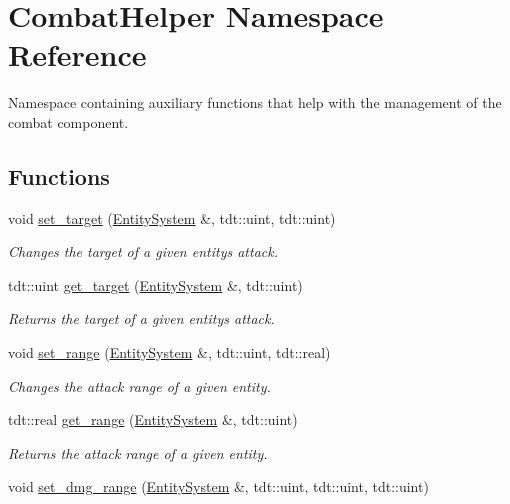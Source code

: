 \hypertarget{namespace_combat_helper}{}\section{Combat\+Helper Namespace Reference}
\label{namespace_combat_helper}


Namespace containing auxiliary functions that help with the management of the combat component.  


\subsection*{Functions}
\begin{DoxyCompactItemize}
\item 
void \hyperlink{namespace_combat_helper_a34b4f68f01f9990710d6b79e766645b7}{set\+\_\+target} (\hyperlink{class_entity_system}{Entity\+System} \&, tdt\+::uint, tdt\+::uint)
\begin{DoxyCompactList}\small\item\em Changes the target of a given entity\textquotesingle{}s attack. \end{DoxyCompactList}\item 
tdt\+::uint \hyperlink{namespace_combat_helper_aa97e064b4a07cd6890138a0e31b52b95}{get\+\_\+target} (\hyperlink{class_entity_system}{Entity\+System} \&, tdt\+::uint)
\begin{DoxyCompactList}\small\item\em Returns the target of a given entity\textquotesingle{}s attack. \end{DoxyCompactList}\item 
void \hyperlink{namespace_combat_helper_a7eff64357d468e07177b1fb653fdf98f}{set\+\_\+range} (\hyperlink{class_entity_system}{Entity\+System} \&, tdt\+::uint, tdt\+::real)
\begin{DoxyCompactList}\small\item\em Changes the attack range of a given entity. \end{DoxyCompactList}\item 
tdt\+::real \hyperlink{namespace_combat_helper_a75225bb00645828965c72bb74aa84e66}{get\+\_\+range} (\hyperlink{class_entity_system}{Entity\+System} \&, tdt\+::uint)
\begin{DoxyCompactList}\small\item\em Returns the attack range of a given entity. \end{DoxyCompactList}\item 
void \hyperlink{namespace_combat_helper_a467e19be07f1a305343dfcc3a2f432da}{set\+\_\+dmg\+\_\+range} (\hyperlink{class_entity_system}{Entity\+System} \&, tdt\+::uint, tdt\+::uint, tdt\+::uint)

\end{DoxyCompactItemize}
